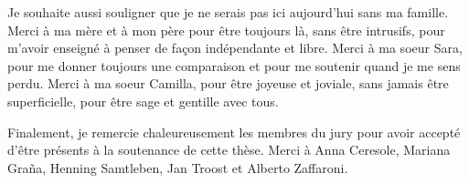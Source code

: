 \documentclass[draft]{phd}
\begin{document}
			Je souhaite aussi souligner que je ne serais pas ici aujourd'hui sans ma famille. 
			Merci à ma mère et à mon père pour être toujours là, sans être intrusifs, pour m'avoir enseigné à penser de façon indépendante et libre.
			Merci à ma soeur Sara, pour me donner toujours une comparaison et pour me soutenir quand je me sens perdu.
			Merci à ma soeur Camilla, pour être joyeuse et 	joviale, sans jamais être superficielle, pour être sage et gentille avec tous.
			
			Finalement, je remercie chaleureusement les membres du jury pour avoir accepté d'être présents à la soutenance de cette thèse. 
			Merci à Anna Ceresole, Mariana Graña, Henning Samtleben, Jan Troost et Alberto Zaffaroni.
\end{document}
